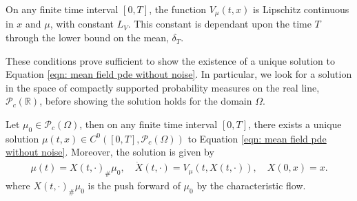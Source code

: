\documentclass[10pt]{article}
\begin{document}
\begin{lemma}\label{lem: V is Lipschitz W_1}
    On any finite time interval $[0,T]$, the function $V_\mu(t,x)$ is Lipschitz continuous in $x$ and $\mu$, with constant $L_V$. This constant is dependant upon the time $T$ through the lower bound on the mean, $\delta_T$.
\end{lemma}

These conditions prove sufficient to show the existence of a unique solution to Equation \eqref{eqn: mean field pde without noise}. In particular, we look for a solution in the space of compactly supported probability measures on the real line,  $\mathcal{P}_c(\mathbb{R})$, before showing the solution holds for the domain $\Omega$.
\begin{theorem}\label{theorem: no noise existence and uniqueness}
    Let $\mu_0 \in \mathcal{P}_c(\Omega)$, then on any finite time interval $[0,T]$, there exists a unique solution $\mu(t,x) \in C^0([0,T], \mathcal{P}_c(\Omega))$ to Equation \eqref{eqn: mean field pde without noise}. Moreover, the solution is given by
    \begin{align*}
        \mu(t) = X(t,\cdot)_\#\mu_0,\quad \dot{X}(t,\cdot) = V_\mu(t,X(t,\cdot)),\quad X(0,x)=x.
    \end{align*}
    where $X(t,\cdot)_\#\mu_0$ is the push forward of $\mu_0$ by the characteristic flow.
\end{theorem}
\end{document}

